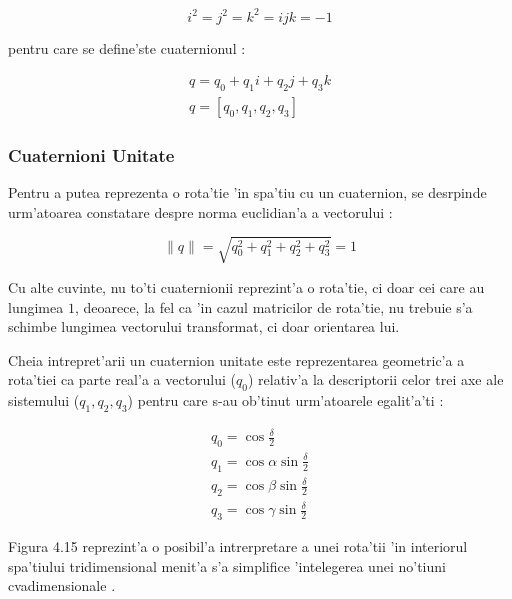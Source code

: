 \documentclass[12pt,a4paper,twoside]{report}
\begin{document}
\begin{equation}
    i^2 = j^2 = k^2 = ijk = -1
\end{equation}

pentru care se define'ste cuaternionul \cite{Jia2015QuaternionsAR}:

\begin{gather}
    q = q_0 + q_1 i + q_2 j + q_3 k \\
    q = [q_0, q_1, q_2, q_3]
\end{gather}

\subsubsection{Cuaternioni Unitate}

Pentru a putea reprezenta o rota'tie 'in spa'tiu cu un cuaternion, se desrpinde urm'atoarea constatare despre norma euclidian'a a vectorului \cite{Jia2015QuaternionsAR}  \cite{article3}:

\begin{equation}
    \lVert  q  \rVert = \sqrt{q^2_0 + q^2_1 + q^2_2 + q^2_3 } = 1
\end{equation}

Cu alte cuvinte, nu to'ti cuaternionii reprezint'a o rota'tie, ci doar cei care au lungimea $1$, deoarece, la fel ca 'in cazul matricilor de rota'tie, nu trebuie s'a schimbe lungimea vectorului transformat, ci doar orientarea lui. 

\vspace{5px}

Cheia intrepret'arii un cuaternion unitate este reprezentarea geometric'a a rota'tiei ca parte real'a a vectorului ($q_0$) relativ'a la descriptorii celor trei axe ale sistemului ($q_1, q_2, q_3$) \cite{quat} pentru care s-au ob'tinut urm'atoarele egalit'a'ti \cite{Hughes2009QuaternionTE} \cite{udemyQuats}:

\begin{gather}
    q_0 = \cos{\frac{\delta}{2}} \\ 
    q_1 = \cos{\alpha} \sin{\frac{\delta}{2}} \\
    q_2 = \cos{\beta} \sin{\frac{\delta}{2}} \\
    q_3 = \cos{\gamma} \sin{\frac{\delta}{2}}
\end{gather}

Figura 4.15 reprezint'a o posibil'a intrerpretare a unei rota'tii 'in interiorul spa'tiului tridimensional menit'a s'a simplifice 'intelegerea unei no'tiuni cvadimensionale \cite{Hughes2009QuaternionTE} \cite{udemyQuats}. 
\end{document}
